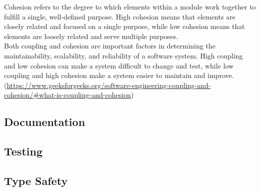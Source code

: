 Cohesion refers to the degree to which elements within a module work together to fulfill a single, well-defined purpose. High cohesion means that elements are closely related and focused on a single purpose, while low cohesion means that elements are loosely related and serve multiple purposes. \\

Both coupling and cohesion are important factors in determining the maintainability, scalability, and reliability of a software system. High coupling and low cohesion can make a system difficult to change and test, while low coupling and high cohesion make a system easier to maintain and improve. \\

(\url{https://www.geeksforgeeks.org/software-engineering-coupling-and-cohesion/#what-is-coupling-and-cohesion})

\subsection{Documentation}

\subsection{Testing}

\subsection{Type Safety}
